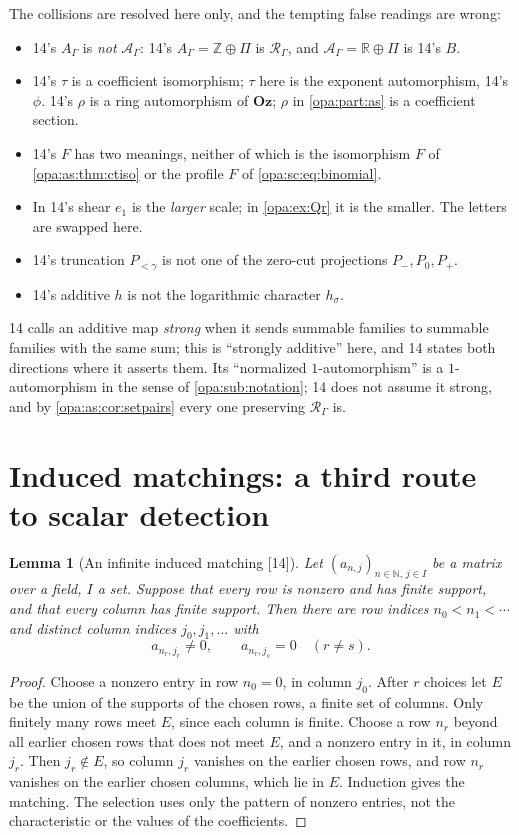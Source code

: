 \documentclass[11pt,oneside]{article}
\numberwithin{equation}{section}
\newtheorem{lemma}[lemma]{Lemma}
\theoremstyle{definition}
\theoremstyle{remark}
\newcommand{\Oz}{\mathbf{Oz}}
\newcommand{\R}{\mathbb R}
\newcommand{\Z}{\mathbb Z}
\newcommand{\N}{\mathbb N}
\newcommand{\src}[1]{\textup{\textsf{\small[#1]}}}
\begin{document}
The collisions are resolved here only, and the tempting false readings are wrong:
\begin{itemize}[itemsep=1pt]
\item 14's $A_\Gamma$ is \emph{not} $\mathcal A_\Gamma$: 14's $A_\Gamma=\Z\oplus\Pi$ is
$\mathcal R_\Gamma$, and $\mathcal A_\Gamma=\R\oplus\Pi$ is 14's $B$.
\item 14's $\tau$ is a coefficient isomorphism; $\tau$ here is the exponent automorphism,
14's $\phi$. 14's $\rho$ is a ring automorphism of $\Oz$; $\rho$ in \cref{opa:part:as} is a
coefficient section.
\item 14's $F$ has two meanings, neither of which is the isomorphism $F$ of
\cref{opa:as:thm:ctiso} or the profile $F$ of \eqref{opa:sc:eq:binomial}.
\item In 14's shear $e_1$ is the \emph{larger} scale; in \cref{opa:ex:Qr} it is the smaller. The
letters are swapped here.
\item 14's truncation $P_{<\gamma}$ is not one of the zero-cut projections $P_-,P_0,P_+$.
\item 14's additive $h$ is not the logarithmic character $h_\sigma$.
\end{itemize}
14 calls an additive map \emph{strong} when it sends summable families to summable families
with the same sum; this is ``strongly additive'' here, and 14 states both directions where it
asserts them. Its ``normalized $1$-automorphism'' is a $1$-automorphism in the sense of
\cref{opa:sub:notation}; 14 does not assume it strong, and by \cref{opa:as:cor:setpairs}
every one preserving $\mathcal R_\Gamma$ is.

\section{Induced matchings: a third route to scalar detection}\label{opa:cm:sec:matching}

\begin{lemma}[An infinite induced matching \src{14}]\label{opa:cm:lem:matching}
Let $(a_{n,j})_{n\in\N,\,j\in I}$ be a matrix over a field, $I$ a set. Suppose that every row
is nonzero and has finite support, and that every column has finite support. Then there are
row indices $n_0<n_1<\cdots$ and distinct column indices $j_0,j_1,\ldots$ with
\[
 a_{n_r,j_r}\ne0,\qquad a_{n_r,j_s}=0\quad(r\ne s).
\]
\end{lemma}
\begin{proof}
Choose a nonzero entry in row $n_0=0$, in column $j_0$. After $r$ choices let $E$ be the union
of the supports of the chosen rows, a finite set of columns. Only finitely many rows meet $E$,
since each column is finite. Choose a row $n_r$ beyond all earlier chosen rows that does not
meet $E$, and a nonzero entry in it, in column $j_r$. Then $j_r\notin E$, so column $j_r$
vanishes on the earlier chosen rows, and row $n_r$ vanishes on the earlier chosen columns,
which lie in $E$. Induction gives the matching. The selection uses only the pattern of
nonzero entries, not the characteristic or the values of the coefficients.
\end{proof}
\end{document}
